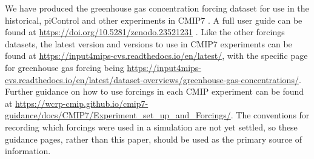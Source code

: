 We have produced the greenhouse gas concentration forcing dataset for use in the historical, piControl
and other experiments in CMIP7 \citep[see publications that describe CMIP7 experiments, e.g.,][]{dunne_cmip7_2025}.
A full user guide can be found at \url{https://doi.org/10.5281/zenodo.23521231} \citep{nicholls_historical-user-guide_2026}.
Like the other forcings datasets, the latest version
and versions to use in CMIP7 experiments can be found at
\url{https://input4mips-cvs.readthedocs.io/en/latest/},
with the specific page for greenhouse gas forcing being
\newline \mbox{\url{https://input4mips-cvs.readthedocs.io/en/latest/dataset-overviews/greenhouse-gas-concentrations/}}.
Further guidance on how to use forcings in each CMIP experiment can be found at
\newline \mbox{\url{https://wcrp-cmip.github.io/cmip7-guidance/docs/CMIP7/Experiment_set_up_and_Forcings/}}.
The conventions for recording which forcings were used in a simulation are not yet settled,
so these guidance pages, rather than this paper, should be used as the primary source of information.

